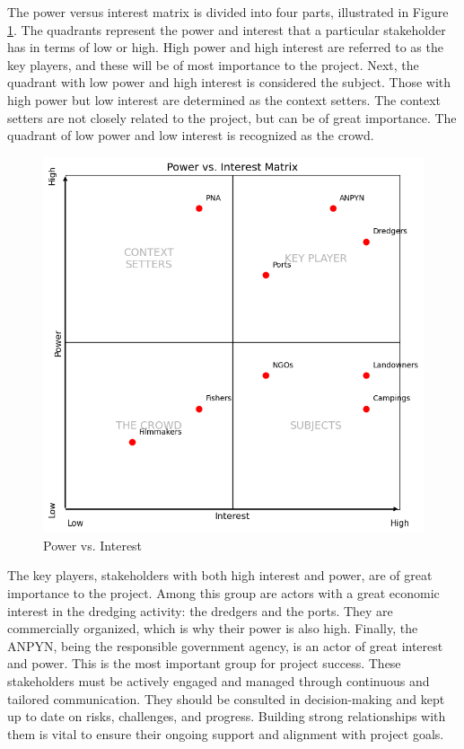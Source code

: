 The power versus interest matrix is divided into four parts, illustrated in Figure \ref{fig:power-interest}. The quadrants represent the power and interest that a particular stakeholder has in terms of low or high. High power and high interest are referred to as the key players, and these will be of most importance to the project. Next, the quadrant with low power and high interest is considered the subject. Those with high power but low interest are determined as the context setters. The context setters are not closely related to the project, but can be of great importance. The quadrant of low power and low interest is recognized as the crowd.

\begin{figure}[H]
    \centering
    \includegraphics[width=0.70\linewidth]{figures/ch3/PowerVSInterest.png}
    \caption{Power vs. Interest}
    \label{fig:power-interest}
\end{figure}

The key players, stakeholders with both high interest and power, are of great importance to the project. Among this group are actors with a great economic interest in the dredging activity: the dredgers and the ports. They are commercially organized, which is why their power is also high. Finally, the ANPYN, being the responsible government agency, is an actor of great interest and power. This is the most important group for project success. These stakeholders must be actively engaged and managed through continuous and tailored communication. They should be consulted in decision-making and kept up to date on risks, challenges, and progress. Building strong relationships with them is vital to ensure their ongoing support and alignment with project goals.

